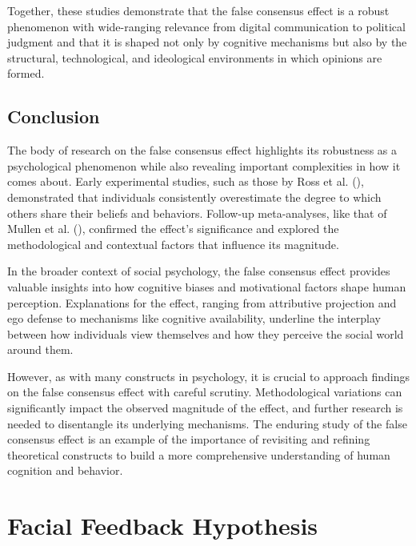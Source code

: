 \documentclass[
  letterpaper,
]{book}
\begin{document}
Together, these studies demonstrate that the false consensus effect is a
robust phenomenon with wide-ranging relevance from digital communication
to political judgment and that it is shaped not only by cognitive
mechanisms but also by the structural, technological, and ideological
environments in which opinions are formed.

\section{Conclusion}\label{conclusion-21}

The body of research on the false consensus effect highlights its
robustness as a psychological phenomenon while also revealing important
complexities in how it comes about. Early experimental studies, such as
those by Ross et al. (),
demonstrated that individuals consistently overestimate the degree to
which others share their beliefs and behaviors. Follow-up meta-analyses,
like that of Mullen et al. (),
confirmed the effect's significance and explored the methodological and
contextual factors that influence its magnitude.

In the broader context of social psychology, the false consensus effect
provides valuable insights into how cognitive biases and motivational
factors shape human perception. Explanations for the effect, ranging
from attributive projection and ego defense to mechanisms like cognitive
availability, underline the interplay between how individuals view
themselves and how they perceive the social world around them.

However, as with many constructs in psychology, it is crucial to
approach findings on the false consensus effect with careful scrutiny.
Methodological variations can significantly impact the observed
magnitude of the effect, and further research is needed to disentangle
its underlying mechanisms. The enduring study of the false consensus
effect is an example of the importance of revisiting and refining
theoretical constructs to build a more comprehensive understanding of
human cognition and behavior.


\chapter{\texorpdfstring{{Facial Feedback
Hypothesis}}{Facial Feedback Hypothesis}}\label{facial-feedback-hypothesis}
\end{document}
